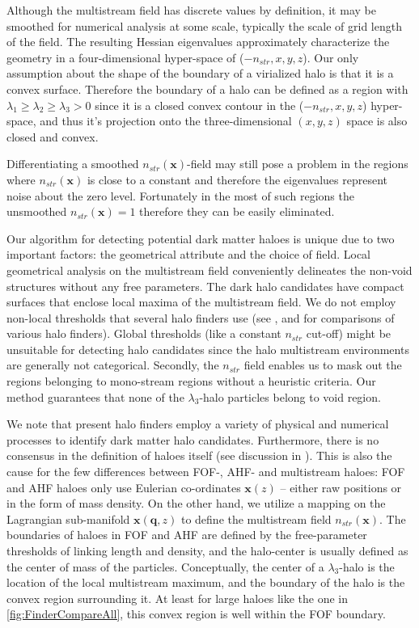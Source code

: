 Although the multistream field has discrete values by definition, it may be smoothed for numerical analysis at some scale, typically the scale of grid length of the field. The resulting Hessian eigenvalues approximately characterize the geometry in a four-dimensional hyper-space of ($-n_{str}, x, y, z$). Our only assumption about  the shape of the boundary of a virialized halo is that it is a convex surface.  Therefore the boundary of a halo can be defined as a region with $\lambda_1 \geq \lambda_2 \geq \lambda_3 > 0$ since it is a closed convex contour in  the ($-n_{str}, x, y, z$) hyper-space, and thus it's projection onto the three-dimensional  $(x,y,z)$ space is also closed and convex. 

Differentiating a smoothed  $n_{str}(\mathbf{x})$-field may still pose a problem in the regions where $n_{str}(\mathbf{x})$ is close to a constant and therefore the eigenvalues represent noise about the zero level. Fortunately in the most of such regions the unsmoothed $n_{str}(\mathbf{x}) =1$ therefore they can be easily eliminated.

Our algorithm for detecting potential dark matter haloes is unique due to two important factors: the geometrical attribute and the choice of field. Local geometrical analysis on the multistream field conveniently delineates the non-void structures without any free parameters. The dark halo candidates have compact surfaces that enclose local maxima of the multistream field. We do not employ non-local thresholds that several halo finders use (see \citealt{Knebe2011a}, \citealt{Knebe2013} and \citealt{Onions2012} for comparisons of various halo finders). Global thresholds (like a constant $n_{str}$ cut-off) might be unsuitable for detecting halo candidates since the halo multistream environments are generally not categorical. Secondly, the $n_{str}$ field enables us to mask out the regions belonging to mono-stream regions without a heuristic criteria. Our method guarantees that none of the $\lambda_3$-halo particles belong to void region. 


We note that present halo finders employ a variety of physical and numerical processes to identify dark matter halo candidates. Furthermore, there is no consensus in the definition of haloes itself (see discussion in \citealt{Knebe2011a}). This is also the cause for the few differences between FOF-, AHF- and multistream haloes: FOF and AHF haloes only use Eulerian co-ordinates $\mathbf{x}(z)$ -- either raw positions or in the form of mass density. On the other hand, we utilize a mapping on the Lagrangian sub-manifold $\mathbf{x}(\mathbf{q}, z)$ to define the multistream field $n_{str}(\mathbf{x})$. The boundaries of haloes in FOF and AHF are defined by the free-parameter thresholds of linking length and density, and the halo-center is usually defined as the center of mass of the particles. Conceptually, the center of a $\lambda_3$-halo is the location of the local multistream maximum, and the boundary of the halo is the convex region surrounding it. At least for large haloes like the one in \autoref{fig:FinderCompareAll}, this convex region is well within the FOF boundary.  

